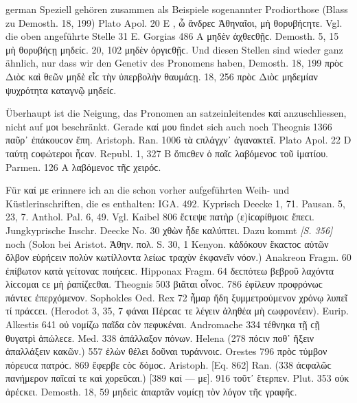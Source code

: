 \begin{otherlanguage*}{german}
Speziell gehören zusammen als Beispiele sogenannter Prodiorthose (Blass zu Demosth. 18, 199) Plato Apol. 20 E , ὦ ἄνδρεϲ Ἀθηναῖοι, μὴ θορυβήϲητε. Vgl. die oben angeführte Stelle 31 E. Gorgias 486 A  μηδὲν ἀχθεϲθῇϲ. Demosth. 5, 15  μὴ θορυβήϲῃ μηδείϲ. 20, 102  μηδὲν ὀργιϲθῇϲ. Und diesen Stellen sind wieder ganz ähnlich, nur dass wir den Genetiv des Pronomens haben, Demosth. 18, 199  πρὸϲ Διὸϲ καὶ θεῶν μηδὲ εἷϲ τὴν ὑπερβολὴν θαυμάϲῃ. 18, 256  πρὸϲ Διὸϲ μηδεμίαν ψυχρότητα καταγνῷ μηδείϲ.

Überhaupt ist die Neigung, das Pronomen an satzeinleitendes καί anzuschliessen, nicht auf μοι beschränkt. Gerade καί μου findet sich auch noch Theognis 1366  παῦρ᾽ ἐπάκουϲον ἔπη. Aristoph. Ran. 1006  τὰ ϲπλάγχν᾽ ἀγανακτεῖ. Plato Apol. 22 D  ταύτῃ ϲοφώτεροι ἦϲαν. Republ. 1, 327 Β  ὄπιϲθεν ὁ παῖϲ λαβόμενοϲ τοῦ ἱματίου. Parmen. 126 Α  λαβόμενοϲ τῆϲ χειρόϲ.

Für καί με erinnere ich an die schon vorher aufgeführten Weih- und Küstlerinschriften, die es enthalten: IGA. 492. Kyprisch Deecke 1, 71. Pausan. 5, 23, 7. Anthol. Pal. 6, 49. Vgl. Kaibel 806  ἔϲτεψε πατὴρ (ε)ἰϲαρίθμοιϲ ἔπεϲι. Jungkyprische Inschr. Deecke No. 30  χθὼν ἧδε καλύπτει. Dazu kommt \hypertarget{p356}{\emph{[S. 356]}}\label{p356} noch (Solon bei Aristot. Ἀθην. πολ. S. 30, 1 Kenyon. κἀδόκουν ἕκαϲτοϲ αὐτῶν ὄλβον εὑρήϲειν πολὺν  κωτίλλοντα λείωϲ τραχὺν ἐκφανεῖν νόον.) Anakreon Fragm. 60  ἐπίβωτον κατὰ γείτοναϲ ποιήϲειϲ. Hipponax Fragm. 64  δεϲπότεω βεβροῦ λαχόντα λίϲϲομαι ϲε μὴ ῥαπίζεϲθαι. Theognis 503  βιᾶται οἶνοϲ. 786  ἐφίλευν προφρόνωϲ πάντεϲ ἐπερχόμενον. Sophokles Oed. Rex 72  ἦμαρ ἤδη ξυμμετρούμενον χρόνῳ λυπεῖ τί πράϲϲει. (Herodot 3, 35, 7 φάναι Πέρϲαϲ τε λέγειν ἀληθέα  μὴ ϲωφρονέειν). Eurip. Alkestis 641  οὐ νομίζω παῖδα ϲὸν πεφυκέναι. Andromache 334 τέθνηκα τῇ ϲῇ θυγατρὶ  ἀπώλεϲε. Med. 338  ἀπάλλαξον πόνων. Helena (278 πόϲιν ποθ᾽ ἥξειν  ἀπαλλάξειν κακῶν.) 557  ἑλὼν θέλει δοῦναι τυράννοιϲ. Orestes 796  πρὸϲ τύμβον πόρευϲα πατρόϲ. 869  ἔφερβε ϲὸϲ δόμοϲ. Aristoph. [Eq. 862] Ran. (338  ἀϲφαλῶϲ πανήμερον παῖϲαί τε καὶ χορεῦϲαι.) [389 καί — με]. 916  τοῦτ᾽ ἔτερπεν. Plut. 353  οὐκ ἀρέϲκει. Demosth. 18, 59  μηδεὶϲ ἀπαρτᾶν νομίϲῃ τὸν λόγον τῆϲ γραφῆϲ.


\end{otherlanguage*}
